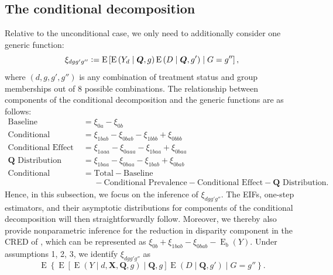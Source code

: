 \documentclass[12pt,a4paper]{article}
\newcommand{\E}{\operatorname{E}}
\def\X{{\boldsymbol X}}
\def\Q{{\boldsymbol Q}}
\newcommand{\defeq}{\vcentcolon=}
\begin{document}
\subsection{The conditional decomposition}
Relative to the unconditional case, we only need to additionally consider one generic function:
$$\xi_{dgg'g''} \defeq \E \left[\E \left(Y_d   \mid \Q, g \right) \E \left(D \mid \Q, g' \right) \mid G=g'' \right],$$
where $(d, g, g', g'')$ is any combination of treatment status and group memberships out of  8 possible combinations. The relationship between components of the conditional decomposition and the generic functions are as follows:
\begin{align*}
    \text{Baseline} &= \xi_{0a}-\xi_{0b}  \\
    \text{Conditional Prevalence} &= \xi_{1bab}-\xi_{0bab}-\xi_{1bbb}+\xi_{0bbb} \\
    \text{Conditional Effect} &= \xi_{1aaa}-\xi_{0aaa} - \xi_{1baa}+\xi_{0baa} \\
    \Q \text{ Distribution} &= \xi_{1baa}-\xi_{0baa} - \xi_{1bab}+\xi_{0bab} \\
    \text{Conditional Selection} &= \text{Total} - \text{Baseline} \\
    &\phantom{{}={}} - \text{Conditional Prevalence} - \text{Conditional Effect} - \Q \text{ Distribution}.
\end{align*}
Hence, in this subsection, we focus on the inference of $\xi_{dgg'g''}$. The EIFs,  one-step estimators, and their asymptotic distributions for components of the conditional decomposition will then straightforwardly follow. Moreover, we thereby also provide nonparametric inference for the reduction in disparity component in the CRED of \citet{jackson_meaningful_2021}, which can be represented as $\xi_{0b}+\xi_{1bab}-\xi_{0bab}-\E_b(Y)$.
Under assumptions 1, 2, 3, we identify $\xi_{dgg'g''}$ as $$\E \left\{\E \left[ \E(Y \mid d,\X,\Q,g)   \mid \Q, g \right] \E \left(D \mid \Q, g' \right) \mid G=g'' \right\}.$$
\end{document}
